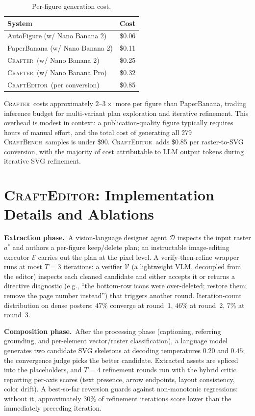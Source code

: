 \documentclass{llmxive}
\providecommand{\Crafter}{\textsc{Crafter}\xspace}
\providecommand{\Editor}{\textsc{CraftEditor}\xspace}
\providecommand{\CrafterBench}{\textsc{CraftBench}\xspace}
\begin{document}
\begin{table}[!htbp]
\centering
\small
\begin{tabular}{@{}lr@{}}
\toprule
\textbf{System} & \textbf{Cost} \\
\midrule
AutoFigure (w/ Nano Banana 2) & \$0.06 \\
PaperBanana (w/ Nano Banana 2) & \$0.11 \\
\Crafter\ (w/ Nano Banana 2) & \$0.25 \\
\Crafter\ (w/ Nano Banana Pro) & \$0.32 \\
\midrule
\Editor\ (per conversion) & \$0.85 \\
\bottomrule
\end{tabular}
\caption{Per-figure generation cost.}
\label{tab:cost}
\end{table}

\Crafter\ costs approximately $2$--$3\times$ more per figure than 
PaperBanana, trading inference budget for multi-variant plan 
exploration and iterative refinement. This overhead is modest in 
context: a publication-quality figure typically requires hours of 
manual effort, and the total cost of generating all $279$
\CrafterBench\ samples is under \$90. \Editor\ adds \$0.85 per 
raster-to-SVG conversion, with the majority of cost attributable to 
LLM output tokens during iterative SVG refinement.

\section{\Editor: Implementation Details and Ablations}
\label{app:editable-ablations}

\noindent\textbf{Extraction phase.}\ 
A vision-language designer agent $\mathcal{D}$ inspects the input
raster $a^*$ and authors a per-figure keep/delete plan; an
instructable image-editing executor $\mathcal{E}$ carries out the
plan at the pixel level.
A verify-then-refine wrapper runs at most $T{=}3$ iterations: a
verifier $\mathcal{V}$ (a lightweight VLM, decoupled from the
editor) inspects each cleaned candidate and either accepts it or
returns a directive diagnostic (e.g., ``the bottom-row icons were
over-deleted; restore them; remove the page number instead'') that
triggers another round.
Iteration-count distribution on dense posters: $47\%$ converge at
round~1, $46\%$ at round~2, $7\%$ at round~3.

\noindent\textbf{Composition phase.}\ 
After the processing phase (captioning, referring grounding, and
per-element vector/raster classification), a language model
generates two candidate SVG skeletons at decoding temperatures
$0.20$ and $0.45$; the convergence judge picks the better
candidate.
Extracted assets are spliced into the placeholders, and $T{=}4$
refinement rounds run with the hybrid critic reporting per-axis
scores (text presence, arrow endpoints, layout consistency, color
drift).
A best-so-far reversion guards against non-monotonic regressions:
without it, approximately $30\%$ of refinement iterations score
lower than the immediately preceding iteration.
\end{document}
